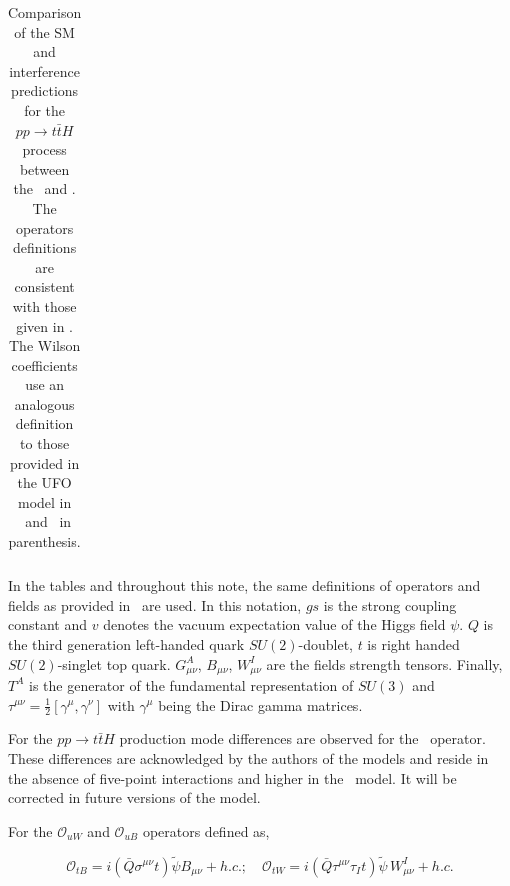 \begin{table}[h!]
{\begin{tabular}{|l|l|c|c|}
      \hline
    \end{tabular}
  }
  \caption{ Comparison of the SM and interference predictions for the $pp\to t\bar{t} H$ process between the \SMEFTsim\ and \SMEFTatNLO. The operators definitions are consistent with those given in \SMEFTatNLO. The Wilson coefficients use an analogous definition to those provided  in the UFO model in \SMEFTatNLO\ and \SMEFTsim\ in parenthesis.}
  \label{tab:higgseft:tthcompa}
\end{table}


In the tables and throughout this note, the same definitions of operators and fields as provided in~\cite{SMEFTNLOdefs} are used. In this notation, $gs$ is the strong coupling constant and $v$ denotes the vacuum expectation value of the Higgs field $\psi$. $Q$ is the third generation left-handed quark $SU(2)$-doublet, $t$ is right handed $SU(2)$-singlet top quark. $G_{\mu\nu}^{A}$, $B_{\mu\nu}$, $W^{I}_{\mu\nu}$ are the fields strength tensors. Finally, $T^{A}$ is the generator of the fundamental representation of $SU(3)$ and $\tau^{\mu\nu}=\frac{1}{2}[\gamma^{\mu},\gamma^{\nu}]$  with $\gamma^{\mu}$ being the Dirac gamma matrices.



For the $pp\to t \bar{t} H$ production mode differences are observed for the \ctG\ operator. These differences are acknowledged by the authors of the models and reside in the absence of five-point interactions and higher in the \SMEFTsim\ model. It will be corrected in future versions of the model.

For the $\mathcal{O}_{uW}$ and $\mathcal{O}_{uB}$ operators defined as,

$$ \mathcal{O}_{tB} = i(\bar Q \sigma^{\mu\nu} t) \tilde \psi  B_{\mu\nu} + h.c.; \quad
   \mathcal{O}_{tW} =  i(\bar{Q} \tau^{\mu\nu}\tau_{I} t)  \tilde{\psi} \, W_{\mu\nu}^I + h. c.
$$

